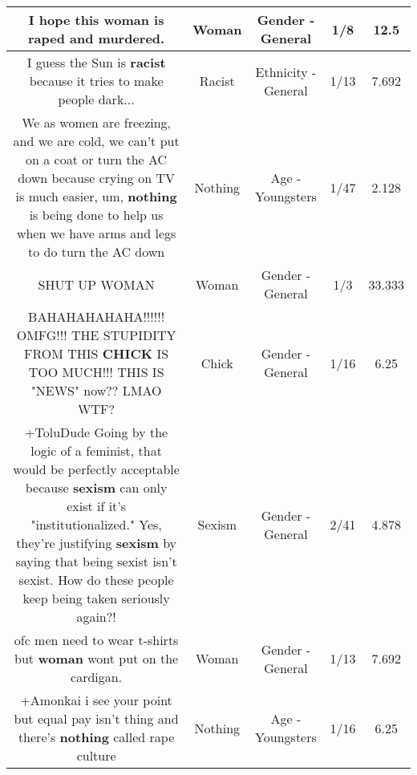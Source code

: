 \documentclass[11pt]{article}
\newlength\mylength
\begin{document}
\begin{center}
\begin{longtable}{|C{.65\mylength}|C{.30\mylength}|C{.12\mylength}|C{.12\mylength}|C{.12\mylength}|}
  \small I hope this \textbf{woman} is raped and murdered.\normalsize   & Woman & Gender - General & 1/8 & 12.5 \\  \hline
  \small I guess the Sun is \textbf{racist} because it tries to make people dark...\normalsize   & Racist & Ethnicity - General & 1/13 & 7.692 \\  \hline
  \small We as women are freezing, and we are cold, we can't put on a coat or turn the AC down because crying on TV is much easier, um, \textbf{nothing} is being done to help us when we have arms and legs to do turn the AC down\normalsize   & Nothing & Age - Youngsters & 1/47 & 2.128 \\  \hline
  \small SHUT UP WOMAN\normalsize   & Woman & Gender - General & 1/3 & 33.333 \\  \hline
  \small BAHAHAHAHAHA!!!!!! OMFG!!! THE STUPIDITY FROM THIS \textbf{CHICK} IS TOO MUCH!!! THIS IS "NEWS" now?? LMAO WTF?\normalsize   & Chick & Gender - General & 1/16 & 6.25 \\  \hline
  \small +ToluDude Going by the logic of a feminist, that would be perfectly acceptable because \textbf{sexism} can only exist if it's "institutionalized." Yes, they're justifying \textbf{sexism} by saying that being sexist isn't sexist. How do these people keep being taken seriously again?!\normalsize   & Sexism & Gender - General & 2/41 & 4.878 \\  \hline
  \small ofc men need to wear t-shirts but \textbf{woman} wont put on the cardigan.\normalsize   & Woman & Gender - General & 1/13 & 7.692 \\  \hline
  \small +Amonkai i see your point but equal pay isn't thing and there's \textbf{nothing} called rape culture\normalsize   & Nothing & Age - Youngsters & 1/16 & 6.25 \\  \hline

\end{longtable}
\end{center}
\end{document}
